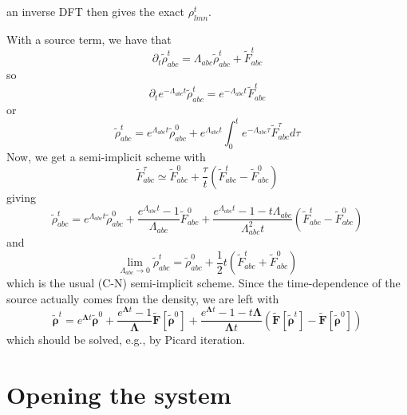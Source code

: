 \documentclass[aps,preprint]{revtex4-1}%
\begin{document}
\bigskip an inverse DFT then gives the exact $\rho_{lmn}^{t}$. 

With a source term, we have that%
\begin{equation}
\partial_{t}\widetilde{\rho}_{abc}^{t}=\Lambda_{abc}\widetilde{\rho}_{abc}%
^{t}+\widetilde{F}_{abc}^{t}%
\end{equation}
so%
\begin{equation}
\partial_{t}e^{-\Lambda_{abc}t}\widetilde{\rho}_{abc}^{t}=e^{-\Lambda_{abc}%
t}\widetilde{F}_{abc}^{t}%
\end{equation}
or%
\begin{equation}
\widetilde{\rho}_{abc}^{t}=e^{\Lambda_{abc}t}\widetilde{\rho}_{abc}%
^{0}+e^{\Lambda_{abc}t}\int_{0}^{t}e^{-\Lambda_{abc}\tau}\widetilde{F}%
_{abc}^{\tau}d\tau
\end{equation}
Now, we get a semi-implicit scheme with%
\begin{equation}
\widetilde{F}_{abc}^{\tau}\simeq\widetilde{F}_{abc}^{0}+\frac{\tau}{t}\left(
\widetilde{F}_{abc}^{t}-\widetilde{F}_{abc}^{0}\right)
\end{equation}
giving%
\begin{equation}
\widetilde{\rho}_{abc}^{t}=e^{\Lambda_{abc}t}\widetilde{\rho}_{abc}^{0}%
+\frac{e^{\Lambda_{abc}t}-1}{\Lambda_{abc}}\widetilde{F}_{abc}^{0}%
+\frac{e^{\Lambda_{abc}t}-1-t\Lambda_{abc}}{\Lambda_{abc}^{2}t}\left(
\widetilde{F}_{abc}^{t}-\widetilde{F}_{abc}^{0}\right)
\end{equation}
and
\begin{equation}
\lim_{\Lambda_{abc}\rightarrow0}\widetilde{\rho}_{abc}^{t}=\widetilde{\rho
}_{abc}^{0}+\frac{1}{2}t\left(  \widetilde{F}_{abc}^{t}+\widetilde{F}%
_{abc}^{0}\right)
\end{equation}
which is the usual (C-N) semi-implicit scheme. Since the time-dependence of
the source actually comes from the density, we are left with%
\begin{equation}
\widetilde{\mathbf{\rho}}^{t}=e^{\mathbf{\Lambda}t}\widetilde{\mathbf{\rho}%
}^{0}+\frac{e^{\mathbf{\Lambda}t}-1}{\mathbf{\Lambda}}\widetilde{\mathbf{F}%
}\left[  \widetilde{\mathbf{\rho}}^{0}\right]  +\frac{e^{\mathbf{\Lambda}%
t}-1-t\mathbf{\Lambda}}{\mathbf{\Lambda}t}\left(  \widetilde{\mathbf{F}%
}\left[  \widetilde{\mathbf{\rho}}^{t}\right]  -\widetilde{\mathbf{F}}\left[
\widetilde{\mathbf{\rho}}^{0}\right]  \right)
\end{equation}
which should be solved, e.g., by Picard iteration. 

\section{Opening the system}
\end{document}
